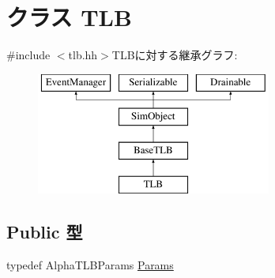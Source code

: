 \hypertarget{classAlphaISA_1_1TLB}{
\section{クラス TLB}
\label{classAlphaISA_1_1TLB}
}


{\ttfamily \#include $<$tlb.hh$>$}TLBに対する継承グラフ:\begin{figure}[H]
\begin{center}
\leavevmode
\includegraphics[height=4cm]{classAlphaISA_1_1TLB}
\end{center}
\end{figure}
\subsection*{Public 型}
\begin{DoxyCompactItemize}
\item 
typedef AlphaTLBParams \hyperlink{classAlphaISA_1_1TLB_a9c268a4095d94dfb9eafa97cb58fcc5b}{Params}
\end{DoxyCompactItemize}
